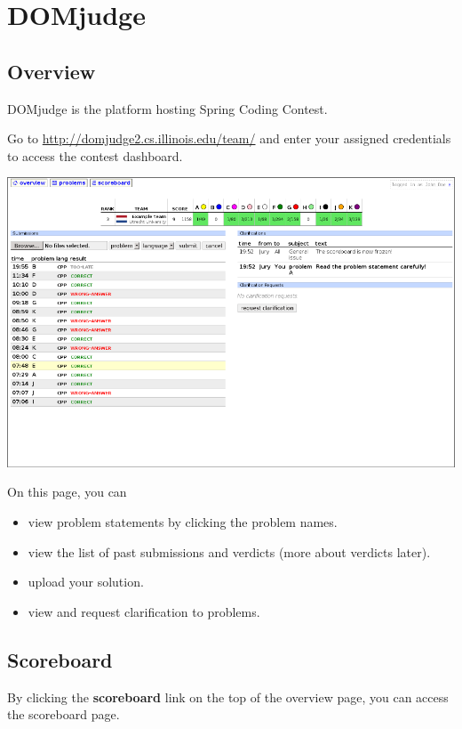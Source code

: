 \documentclass {article}
\begin{document}
\tableofcontents

\newpage
\section{DOMjudge}
\subsection{Overview}
DOMjudge is the platform hosting Spring Coding Contest.

Go to \url{http://domjudge2.cs.illinois.edu/team/} and enter your assigned 
credentials to access the contest dashboard.

\begin{center}
    \includegraphics[scale=0.3]{dashboard.png}
\end{center}

On this page, you can
\begin{itemize}
\item view problem statements by clicking the problem names.
\item view the list of past submissions and verdicts (more about verdicts
      later).
\item upload your solution.
\item view and request clarification to problems.
\end{itemize}

\subsection{Scoreboard}
By clicking the \textbf{scoreboard} link on the top of the overview page, you
can access the scoreboard page. 
\end{document}
